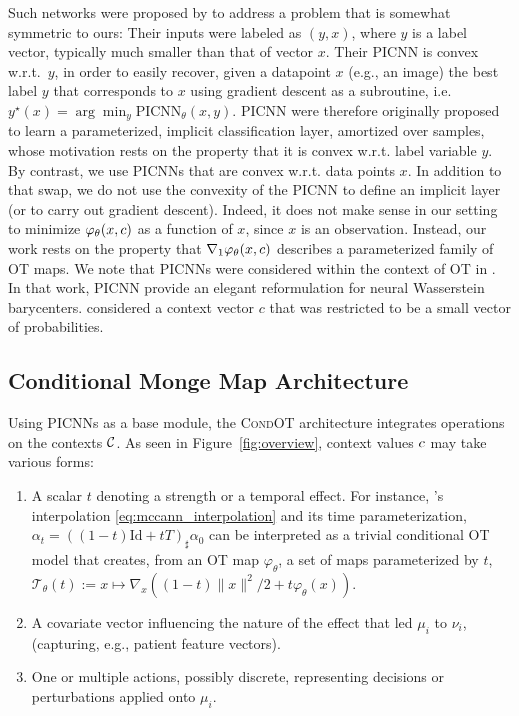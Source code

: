 Such networks were proposed by \citet[Eq. 3]{amos2017input} to address a problem that is somewhat symmetric to ours: Their inputs were labeled as $(y, x)$, where $y$ is a label vector, typically much smaller than that of vector $x$. Their PICNN is convex w.r.t.~$y$, in order to easily recover, given a datapoint $x$ (e.g., an image) the best label $y$ that corresponds to $x$ using gradient descent as a subroutine, i.e. $y^\star(x) = \arg\min_y \text{PICNN}_\theta(x,y)$. PICNN were therefore originally proposed to learn a parameterized, implicit classification layer, amortized over samples, whose motivation rests on the property that it is convex w.r.t. label variable $y$. By contrast, we use PICNNs that are convex w.r.t. data points $x$. In addition to that swap, we do not use the convexity of the PICNN to define an implicit layer (or to carry out gradient descent). Indeed, it does not make sense in our setting to minimize $\varphi_\theta(x,c)$ as a function of $x$, since $x$ is an observation. Instead, our work rests on the property that $\nabla_1 \varphi_\theta(x,c)$ describes a parameterized family of OT maps. We note that PICNNs were considered within the context of OT in \cite[Appendix B]{fan2021scalable}. In that work, PICNN provide an elegant reformulation for neural Wasserstein barycenters. \citet{fan2021scalable} considered a context vector $c$ that was restricted to be a small vector of probabilities.


\subsection{Conditional Monge Map Architecture}\label{subsec:combin}
Using PICNNs as a base module, the \textsc{CondOT} architecture integrates operations on the contexts ${\mathcal{C}}$. As seen in Figure~\ref{fig:overview}, context values $c$ may take various forms:
\begin{enumerate}[noitemsep,leftmargin=.35cm,topsep=0pt,parsep=0pt,partopsep=0pt]
\item A scalar $t$ denoting a strength or a temporal effect. For instance, \citeauthor{mccann1997convexity}'s interpolation \eqref{eq:mccann_interpolation} and its time parameterization, $\alpha_{t}=((1-t) \text{Id}+t T)_{\sharp} \alpha_{0}$ \citep{mccann1997convexity} can be interpreted as a trivial conditional OT model that creates, from an OT map $\varphi_\theta$, a set of maps parameterized by $t$, $\mathcal{T}_\theta(t):=x\mapsto\nabla_x \left((1-t)\|x\|^2/2 +t \varphi_\theta(x)\right)$.
\item A covariate vector influencing the nature of the effect that led $\mu_i$ to $\nu_i$, (capturing, e.g., patient feature vectors).
\item One or multiple actions, possibly discrete, representing decisions or perturbations applied onto $\mu_i$.
\end{enumerate}

